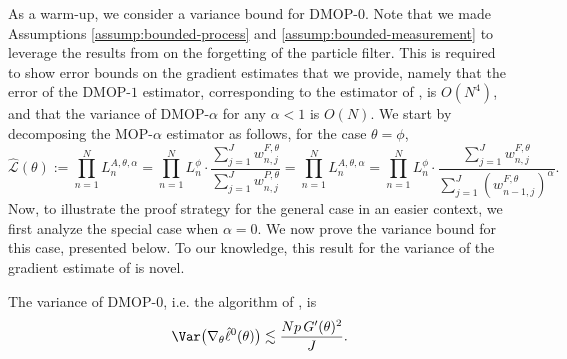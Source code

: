 As a warm-up, we consider a variance bound for DMOP-$0$.
Note that we made Assumptions \ref{assump:bounded-process} and \ref{assump:bounded-measurement} to leverage the results from \cite{karjalainen23} on the forgetting of the particle filter. 
This is required to show error bounds on the gradient estimates that we provide, namely that the error of the DMOP-$1$ estimator, corresponding to the estimator of \cite{poyiadjis11}, is $O(N^4)$, and that the variance of DMOP-$\alpha$ for any $\alpha<1$ is $O(N)$. 
We start by decomposing the MOP-$\alpha$ estimator as follows, for the case $\theta=\phi$,
\begin{equation}
\hat{\mathcal{L}}(\theta):=\prod_{n=1}^N L_n^{A, \theta, \alpha}=\prod_{n=1}^N L_n^\phi \cdot \frac{\sum_{j=1}^J w_{n, j}^{F, \theta}}{\sum_{j=1}^J w_{n, j}^{P, \theta}}=\prod_{n=1}^N L_n^{A, \theta, \alpha}=\prod_{n=1}^N L_n^\phi \cdot \frac{\sum_{j=1}^J w_{n, j}^{F, \theta}}{\sum_{j=1}^J (w_{n-1, j}^{F, \theta})^\alpha}.
\end{equation}
Now, to illustrate the proof strategy for the general case in an easier context, we first analyze the special case when $\alpha=0$.
We now prove the variance bound for this case, presented below. To our knowledge, this result for the variance of the gradient estimate of \cite{naesseth18} is novel. 
\begin{thm}
The variance of DMOP-$0$, i.e. the algorithm of \cite{naesseth18}, is
 \begin{equation}
     \Var\big(\nabla_\theta \hat\ell^0(\theta)\big) \lesssim \frac{Np \, G'(\theta)^2}{J}.
 \end{equation}
\end{thm}
